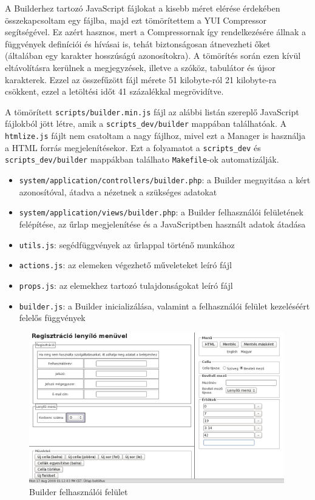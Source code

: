 \documentclass[12pt,a4paper,twoside]{article}
\newcommand{\fitem}[1]{\item \texttt{#1}:}
\begin{document}
A Builderhez tartozó JavaScript fájlokat a kisebb méret elérése érdekében
összekapcsoltam egy fájlba, majd ezt tömörítettem a YUI Compressor\cite{YUI}
segítségével. Ez azért hasznos, mert a Compressornak így rendelkezésére állnak a
függvények definíciói és hívásai is, tehát biztonságosan átnevezheti őket
(általában egy karakter hosszúságú azonosítokra). A tömörítés során ezen kívül
eltávolításra kerülnek a megjegyzések, illetve a szóköz, tabulátor és újsor
karakterek. Ezzel az összefűzött fájl mérete 51 kilobyte-ról 21 kilobyte-ra
csökkent, ezzel a letöltési időt 41 százalékkal megrövidítve.

A tömörített \texttt{scripts/builder.min.js} fájl az alábbi listán
szereplő JavaScript fájlokból jött létre, amik a \texttt{scripts\_dev/builder}
mappában találhatóak. A \texttt{htmlize.js} fájlt nem csatoltam a nagy fájlhoz,
mivel ezt a Manager is használja a HTML forrás megjelenítésekor. Ezt a
folyamatot a \texttt{scripts\_dev} és \texttt{scripts\_dev/builder} mappákban
találhato \texttt{Makefile}-ok automatizálják\cite{make}.

\begin{itemize}
\fitem{system/application/controllers/builder.php} a Builder megnyitása a kért
azonosítóval, átadva a nézetnek a szükséges adatokat
\fitem{system/application/views/builder.php} a Builder felhasználói felületének
felépítése, az űrlap megjelenítése és a JavaScriptben használt adatok
átadása
\fitem{utils.js} segédfüggvények az űrlappal történő munkához
\fitem{actions.js} az elemeken végezhető műveleteket leíró fájl
\fitem{props.js} az elemekhez tartozó tulajdonságokat leíró fájl
\fitem{builder.js} a Builder inicializálása, valamint a felhasználói felület
kezeléséért felelős függvények
\end{itemize}

\clearpage
\begin{figure}[H]
  \centering
  \includegraphics[width=420px]{builder.png}
  \caption{Builder felhasználói felület}\label{fig:builder}
\end{figure}
\end{document}
